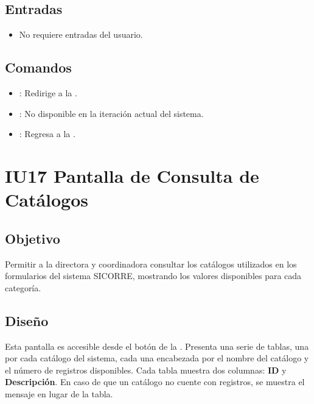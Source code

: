 \subsection{Entradas}
\begin{itemize}
	\item No requiere entradas del usuario.
\end{itemize}

\subsection{Comandos}
\begin{itemize}
	\item {}: Redirige a la 
	.
	\item {}: No disponible en 
	la iteración actual del sistema.
	\item {}: Regresa a la .
\end{itemize}

\section{IU17 Pantalla de Consulta de Catálogos}

\subsection{Objetivo}
Permitir a la directora y coordinadora consultar los catálogos utilizados en los 
formularios del sistema SICORRE, mostrando los valores disponibles para cada 
categoría.

\subsection{Diseño}
Esta pantalla  es accesible desde 
el botón  de la . Presenta una serie de tablas, una por cada catálogo del 
sistema, cada una encabezada por el nombre del catálogo y el número de registros 
disponibles. Cada tabla muestra dos columnas: \textbf{ID} y \textbf{Descripción}. 
En caso de que un catálogo no cuente con registros, se muestra el mensaje 
 en lugar de la tabla.

